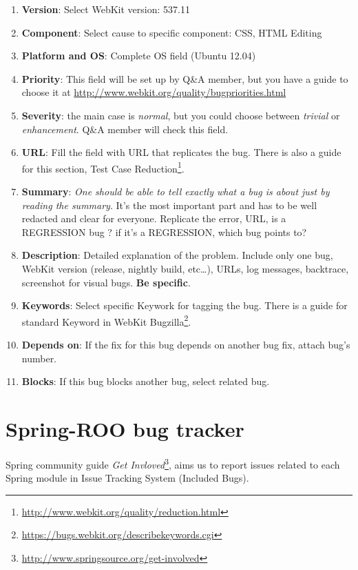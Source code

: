 \documentclass[11pt]{scrartcl}
\begin{document}
\begin{enumerate}
	\item \textbf{Version}: Select WebKit version: 537.11
	\item \textbf{Component}: Select cause to specific component: CSS, HTML Editing
	\item \textbf{Platform and OS}: Complete OS field (Ubuntu 12.04)
	\item \textbf{Priority}: This field will be set up by Q\&A member, but you have a guide to choose it at \url{http://www.webkit.org/quality/bugpriorities.html}
	\item \textbf{Severity}: the main case is \emph{normal}, but you could choose between \emph{trivial} or \emph{enhancement}. Q\&A member will check this field.
	\item \textbf{URL}: Fill the field with URL that replicates the bug. There is also a guide for this section, Test Case Reduction\footnote{\url{http://www.webkit.org/quality/reduction.html}}.
	\item \textbf{Summary}: \emph{One should be able to tell exactly what a bug is about just by reading the summary}. It's the most important part and has to be well redacted and clear for everyone. Replicate the error, URL, is a REGRESSION bug ? if it's a REGRESSION, which bug points to?
    \item \textbf{Description}: Detailed explanation of the problem. Include only one bug, WebKit version (release, nightly build, etc\ldots), URLs, log messages, backtrace, screenshot for visual bugs. \textbf{Be specific}.
     \item \textbf{Keywords}: Select specific Keywork for tagging the bug. There is a guide for standard Keyword in WebKit Bugzilla\footnote{\url{https://bugs.webkit.org/describekeywords.cgi}}.
     \item \textbf{Depends on}: If the fix for this bug depends on another bug fix, attach bug's number.
     \item \textbf{Blocks}: If this bug blocks another bug, select related bug.
\end{enumerate}


\section{Spring-ROO bug tracker}
\label{sec:spring-roo-jira}

\par Spring community guide \emph{Get Invloved}\footnote{\url{http://www.springsource.org/get-involved}}, aims us to report issues related to each Spring module in Issue Tracking System (Included Bugs).
\end{document}
